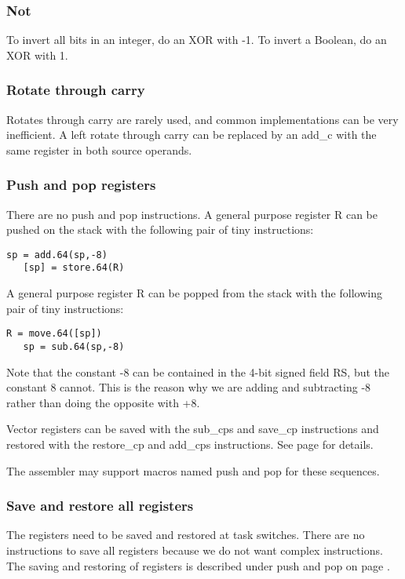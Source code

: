\documentclass[forwardcom.tex]{subfiles}
\begin{document}
\subsubsection{Not}
To invert all bits in an integer, do an XOR with -1. To invert a Boolean, do an XOR with 1.

\subsubsection{Rotate through carry}
Rotates through carry are rarely used, and common implementations can be very inefficient. A left rotate through carry can be replaced by an add\_c with the same register in both source operands.

\subsubsection{Push and pop registers}
\label{pushPop}
There are no push and pop instructions. A general purpose register R can be pushed on the stack with the following pair of tiny instructions:

\begin{lstlisting}[frame=none]
   sp = add.64(sp,-8)
   [sp] = store.64(R)
\end{lstlisting}

A general purpose register R can be popped from the stack with the following pair of tiny instructions:

\begin{lstlisting}[frame=none]
   R = move.64([sp])
   sp = sub.64(sp,-8)
\end{lstlisting}

Note that the constant -8 can be contained in the 4-bit signed field RS, but the constant 8 cannot. This is the reason why we are adding and subtracting -8 rather than doing the opposite with +8.
\vspace{2mm}

Vector registers can be saved with the sub\_cps and save\_cp instructions and restored with the restore\_cp and add\_cps instructions. See page \pageref{table:saveCpInstruction} for details.
\vspace{2mm}

The assembler may support macros named push and pop for these sequences.


\subsubsection{Save and restore all registers}
The registers need to be saved and restored at task switches. There are no instructions to save all registers because we do not want complex instructions. The saving and restoring of registers is described under push and pop on page \pageref{pushPop}.
\end{document}
